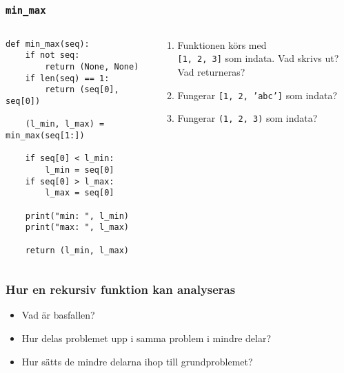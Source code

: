 \documentclass{beamer}
\begin{document}
  \begin{frame}[fragile]
    \frametitle{\texttt{min\_max}}

    \begin{columns}
      \begin{column}{0.48\textwidth}
        \begin{verbatim}
def min_max(seq):
    if not seq:
        return (None, None)
    if len(seq) == 1:
        return (seq[0], seq[0])

    (l_min, l_max) = min_max(seq[1:])

    if seq[0] < l_min:
        l_min = seq[0]
    if seq[0] > l_max:
        l_max = seq[0]

    print("min: ", l_min)
    print("max: ", l_max)

    return (l_min, l_max)
        \end{verbatim}


      \end{column}%
      \begin{column}{0.48\textwidth}
        \begin{enumerate}
          \item Funktionen körs med \\ \texttt{[1, 2, 3]} som indata. Vad skrivs ut? Vad returneras?
          \item Fungerar \texttt{[1, 2, 'abc']} som indata?
          \item Fungerar \texttt{(1, 2, 3)} som indata?
        \end{enumerate}
      \end{column}
    \end{columns}

  \end{frame}

  \begin{frame}
    \frametitle{Hur en rekursiv funktion kan analyseras}

    \begin{itemize}
      \item Vad är basfallen?
      \item Hur delas problemet upp i samma problem i mindre delar?
      \item Hur sätts de mindre delarna ihop till grundproblemet?
    \end{itemize}

  \end{frame}
\end{document}

